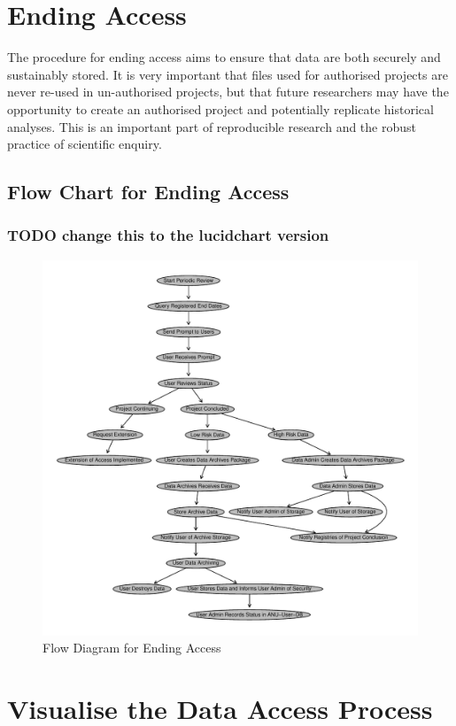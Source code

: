 \documentclass[a4paper]{article}
\begin{document}
\section{Ending Access}
\label{sec-5}

The procedure for ending access aims to ensure that data are both securely and sustainably stored.  It is very important that files used for authorised projects are never re-used in un-authorised projects, but that future researchers may have the opportunity to create an authorised project and potentially replicate historical analyses.  This is an important part of reproducible research and the robust practice of scientific enquiry.
\subsection{Flow Chart for Ending Access}
\label{sec-5-1}
\subsubsection{\textbf{TODO} change this to the lucidchart version}
\label{sec-5-1-1}


\begin{figure}[!h]
\centering
\includegraphics[width=\textwidth]{DataAccessFlowDiagram-EndAccess.pdf}
\caption{Flow Diagram for Ending Access}
\label{fig:DataAccessFlowDiagram-EndAccess}
\end{figure}
\clearpage
\section{Visualise the Data Access Process}
\label{sec-6}
\end{document}
